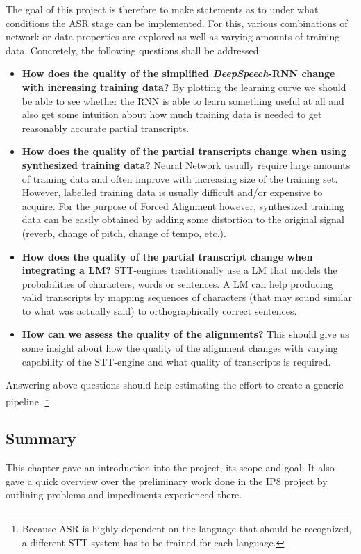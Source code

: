 The goal of this project is therefore to make statements as to under what conditions the \ac{ASR} stage can be implemented. For this, various combinations of network or data properties are explored as well as varying amounts of training data. Concretely, the following questions shall be addressed:

\begin{itemize}
	\item \textbf{How does the quality of the simplified \textit{DeepSpeech}-\ac{RNN} change with increasing training data?} By plotting the learning curve we should be able to see whether the RNN is able to learn something useful at all and also get some intuition about how much training data is needed to get reasonably accurate partial transcripts.
	\item \textbf{How does the quality of the partial transcripts change when using synthesized training data?} Neural Network usually require large amounts of training data and often improve with increasing size of the training set. However, labelled training data is usually difficult and/or expensive to acquire. For the purpose of Forced Alignment however, synthesized training data can be easily obtained by adding some distortion to the original signal (reverb, change of pitch, change of tempo, etc.).
	\item \textbf{How does the quality of the partial transcript change when integrating a \ac{LM}?} \ac{STT}-engines traditionally use a \ac{LM} that models the probabilities of characters, words or sentences. A \ac{LM} can help producing valid transcripts by mapping sequences of characters (that may sound similar to what was actually said) to orthographically correct sentences.
	\item \textbf{How can we assess the quality of the alignments?} This should give us some insight about how the quality of the alignment changes with varying capability of the \ac{STT}-engine and what quality of transcripts is required.
\end{itemize}

Answering above questions should help estimating the effort to create a generic pipeline. \footnote{Because \ac{ASR} is highly dependent on the language that should be recognized, a different \ac{STT} system has to be trained for each language.}

\subsection{Summary}
This chapter gave an introduction into the project, its scope and goal. It also gave a quick overview over the preliminary work done in the IP8 project by outlining problems and impediments experienced there.